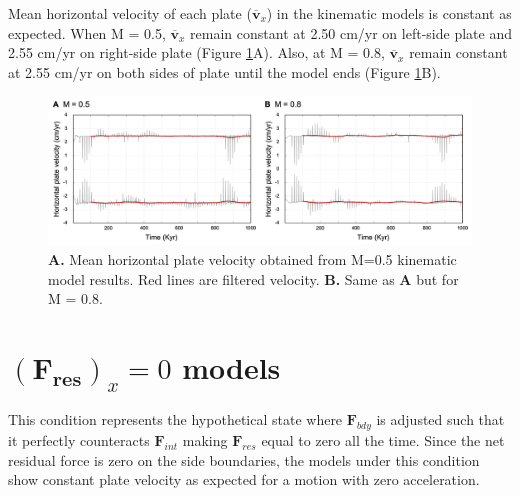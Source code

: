 \documentclass[letterpaper,12pt,notitle]{memphisthesis}                     %
\begin{document}
Mean horizontal velocity of each plate ($\overline{\boldsymbol{v}}_{x}$) in the kinematic models is constant as expected. 
When M = 0.5, $\overline{\boldsymbol{v}}_{x}$ remain constant at 2.50 cm/yr on left-side plate and 2.55 cm/yr on right-side plate (Figure \ref{fig:kmhv}A). Also, at M = 0.8, $\overline{\boldsymbol{v}}_{x}$ remain constant at 2.55 cm/yr on both sides of plate until the model ends (Figure \ref{fig:kmhv}B). %
%
\begin{figure}[!htb]
	\centering
	\includegraphics[width=0.98\linewidth,trim=4 4 4 4,clip]{./figs/kmhv.png}
	\caption{\textbf{A.} Mean horizontal plate velocity obtained from M=0.5 kinematic model results. Red lines are filtered velocity. \textbf{B.} Same as \textbf{A} but for M = 0.8. }
	\label{fig:kmhv}
\end{figure}

\section{$(\boldsymbol{F_{res}})_x=0$ models}

This condition represents the hypothetical state where $\boldsymbol{F}_{bdy}$ is adjusted such that it perfectly counteracts $\boldsymbol{F}_{int}$ making $\boldsymbol{F}_{res}$ equal to zero all the time. %
Since the net residual force is zero on the side boundaries, the models under this condition show constant plate velocity as expected for a motion with zero acceleration.
\end{document}
